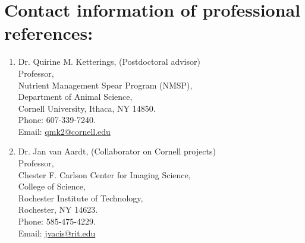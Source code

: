\documentclass[11pt]{article}
\begin{document}
\section*{Contact information of professional references:}
\begin{enumerate}[itemsep=1em]
\item Dr. Quirine M. Ketterings, (Postdoctoral advisor)\\
Professor,\\
Nutrient Management Spear Program (NMSP), \\
Department of Animal Science,\\
Cornell University, Ithaca, NY 14850.\\
Phone: 607-339-7240. \\
Email: \url{qmk2@cornell.edu}

\item Dr. Jan van Aardt, (Collaborator on Cornell projects)\\
Professor,\\
Chester F. Carlson Center for Imaging Science,\\
College of Science, \\
Rochester Institute of Technology,\\
Rochester, NY 14623.\\
Phone: 585-475-4229.\\
Email: \url{jvacis@rit.edu}


\end{enumerate}
\end{document}
